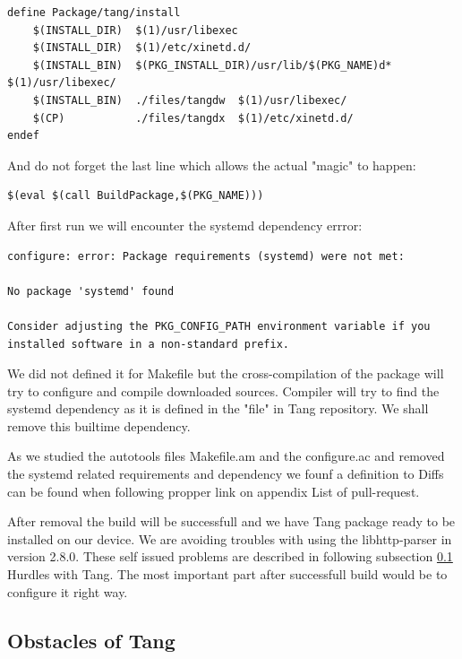 \begin{lstlisting}[columns=fixed,basicstyle=\ttfamily\footnotesize,tabsize=4,backgroundcolor=\color{yellow!10}]
define Package/tang/install
	$(INSTALL_DIR)	$(1)/usr/libexec
	$(INSTALL_DIR)	$(1)/etc/xinetd.d/
	$(INSTALL_BIN)	$(PKG_INSTALL_DIR)/usr/lib/$(PKG_NAME)d*	$(1)/usr/libexec/
	$(INSTALL_BIN)	./files/tangdw	$(1)/usr/libexec/
	$(CP)			./files/tangdx	$(1)/etc/xinetd.d/
endef
\end{lstlisting}
And do not forget the last line which allows the actual "magic" to happen:
\begin{lstlisting}[columns=fixed,basicstyle=\ttfamily\footnotesize,tabsize=4,backgroundcolor=\color{yellow!10}]
$(eval $(call BuildPackage,$(PKG_NAME)))
\end{lstlisting}

After first run we will encounter the systemd dependency errror:
\begin{lstlisting}[columns=fixed,basicstyle=\ttfamily\footnotesize,tabsize=4,backgroundcolor=\color{yellow!10}]
configure: error: Package requirements (systemd) were not met:

No package 'systemd' found

Consider adjusting the PKG_CONFIG_PATH environment variable if you
installed software in a non-standard prefix.
\end{lstlisting}
We did not defined it for Makefile but the cross-compilation of the package will try to configure and compile downloaded sources.
Compiler will try to find the systemd dependency as it is defined in the "file" in Tang repository.
We shall remove this builtime dependency.

As we studied the autotools files Makefile.am and the configure.ac and removed the systemd related requirements and dependency we founf a definition to
Diffs can be found when following propper link on appendix \label{diffs} List of pull-request.

After removal the build will be successfull and we have Tang package ready to be installed on our device.
We are avoiding troubles with using the libhttp-parser in version 2.8.0.
These self issued problems are described in following subsection \ref{porting_problems} Hurdles with Tang.
The most important part after successfull build would be to configure it right way.



\subsection{Obstacles of Tang}\label{porting_problems}

\newpage
